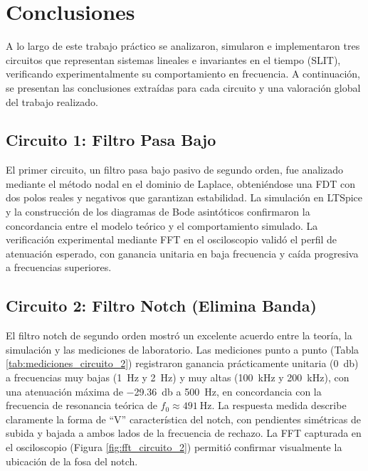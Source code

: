 \section{Conclusiones}
\label{chap:conclusiones}

A lo largo de este trabajo práctico se analizaron, simularon e implementaron tres circuitos que representan sistemas lineales e invariantes en el tiempo (SLIT), verificando experimentalmente su comportamiento en frecuencia. A continuación, se presentan las conclusiones extraídas para cada circuito y una valoración global del trabajo realizado.

\subsection{Circuito 1: Filtro Pasa Bajo}
El primer circuito, un filtro pasa bajo pasivo de segundo orden, fue analizado mediante el método nodal en el dominio de Laplace, obteniéndose una FDT con dos polos reales y negativos que garantizan estabilidad. La simulación en LTSpice y la construcción de los diagramas de Bode asintóticos confirmaron la concordancia entre el modelo teórico y el comportamiento simulado. La verificación experimental mediante FFT en el osciloscopio validó el perfil de atenuación esperado, con ganancia unitaria en baja frecuencia y caída progresiva a frecuencias superiores.

\subsection{Circuito 2: Filtro Notch (Elimina Banda)}
El filtro notch de segundo orden mostró un excelente acuerdo entre la teoría, la simulación y las mediciones de laboratorio. Las mediciones punto a punto (Tabla \ref{tab:mediciones_circuito_2}) registraron ganancia prácticamente unitaria (\SI{0}{\decibel}) a frecuencias muy bajas (\SI{1}{\hertz} y \SI{2}{\hertz}) y muy altas (\SI{100}{\kilo\hertz} y \SI{200}{\kilo\hertz}), con una atenuación máxima de \SI{-29.36}{\decibel} a \SI{500}{\hertz}, en concordancia con la frecuencia de resonancia teórica de $f_0 \approx \SI{491}{\hertz}$. La respuesta medida describe claramente la forma de ``V'' característica del notch, con pendientes simétricas de subida y bajada a ambos lados de la frecuencia de rechazo. La FFT capturada en el osciloscopio (Figura \ref{fig:fft_circuito_2}) permitió confirmar visualmente la ubicación de la fosa del notch.

